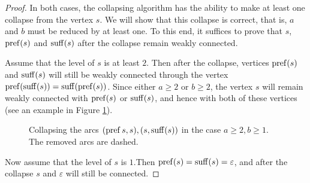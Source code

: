 \begin{proof}
In both cases, the collapsing algorithm has the ability to make at least one collapse from the vertex $ s $. We will show that this collapse is correct, that is, $ a $ and $ b $ must be reduced by at least one. To this end, it suffices to prove that $ s $, $ \operatorname{pref} (s) $ and $ \operatorname{suff} (s) $ after the collapse remain weakly connected.

Assume that the level of $ s $ is at least $ 2 $. Then after the collapse, vertices $ \operatorname{pref}(s) $ and $ \operatorname{suff} (s) $ will still be weakly connected through the vertex $ \operatorname{pref} (\operatorname{suff} (s)) = \operatorname{suff} (\operatorname{pref} (s)) $. Since either $ a \ge 2 $ or $ b \ge 2 $, the vertex $ s $ will remain weakly connected with $ \operatorname{pref} (s) $ or $ \operatorname{suff} (s) $, and hence with both of these vertices (see an example in Figure \ref{fig:collapsea2b1}).

\begin{figure}[ht]
\begin{center}

\end{center}
    
\caption{Collapsing the arcs $(\operatorname{pref}{s}, s), (s, \operatorname{suff}(s))$ in the case $a \ge 2, b \ge 1$. The removed arcs are dashed. }\label{fig:collapsea2b1}
\end{figure}

Now assume that the level of $s$ is $1$.Then $ \operatorname{pref} (s) = \operatorname{suff} (s) = \varepsilon $, and after the collapse $s$ and $ \varepsilon $ will still be connected.
\end{proof}

